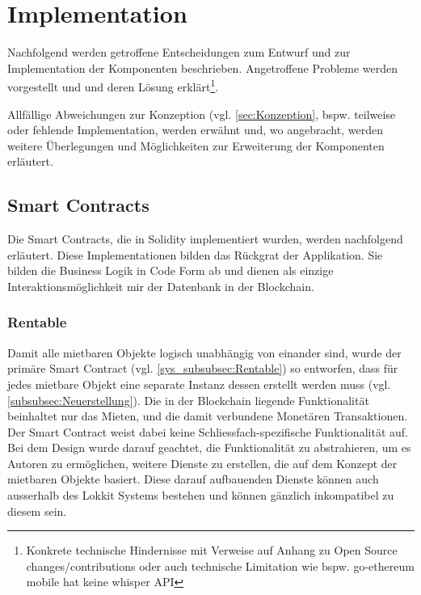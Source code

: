 \section{Implementation}
\label{sec:Implementation}
Nachfolgend werden getroffene Entscheidungen zum Entwurf und zur Implementation der Komponenten beschrieben. Angetroffene Probleme werden vorgestellt und und deren Lösung erklärt\footnote{Konkrete technische Hindernisse mit Verweise auf Anhang zu Open Source changes/contributions oder auch technische Limitation wie bspw. go-ethereum mobile hat keine whisper API}.

Allfällige Abweichungen zur Konzeption (vgl. \ref{sec:Konzeption}, bspw. teilweise oder fehlende Implementation, werden erwähnt und, wo angebracht, werden weitere Überlegungen und Möglichkeiten zur Erweiterung der Komponenten erläutert.

\subsection{Smart Contracts}
\label{subsec:Smart_Contracts}
Die Smart Contracts, die in Solidity implementiert wurden, werden nachfolgend erläutert. Diese Implementationen bilden das Rückgrat der Applikation. Sie bilden die Business Logik in Code Form ab und dienen als einzige Interaktionsmöglichkeit mir der Datenbank in der Blockchain.\cite[Introduction to Smart Contracts]{solidity.readthedocs.io}

\subsubsection{Rentable}
\label{subsubsec:Rentable}
Damit alle mietbaren Objekte logisch unabhängig von einander sind, wurde der primäre Smart Contract (vgl. \ref{sys_subsubsec:Rentable}) so entworfen, dass für jedes mietbare Objekt eine separate Instanz dessen erstellt werden muss (vgl. \ref{subsubsec:Neuerstellung}). Die in der Blockchain liegende Funktionalität beinhaltet nur das Mieten, und die damit verbundene Monetären Transaktionen. Der Smart Contract weist dabei keine Schliessfach-spezifische Funktionalität auf. Bei dem Design wurde darauf geachtet, die Funktionalität zu abstrahieren, um es Autoren zu ermöglichen, weitere Dienste zu erstellen, die auf dem Konzept der mietbaren Objekte basiert. Diese darauf aufbauenden Dienste können auch ausserhalb des Lokkit Systems bestehen und können gänzlich inkompatibel zu diesem sein.


